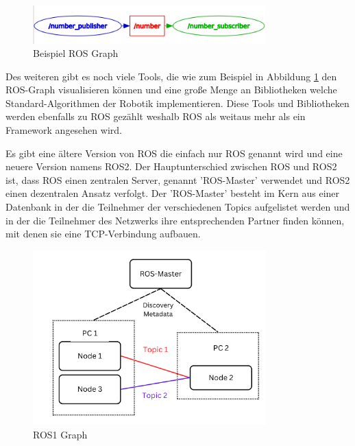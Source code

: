 \begin{flushleft}
\begin{description}
        \begin{figure}[h!]
            \centering
            \includegraphics[width=0.8\textwidth]{imgs/Grundbegriffe/graph_2_nodes_with_topic.png}
            \caption{Beispiel ROS Graph}
            \label{fig:ros_graph}%
        \end{figure}

        Des weiteren gibt es noch viele Tools, die wie zum Beispiel in Abbildung \ref{fig:ros_graph} den ROS-Graph visualisieren können und eine große Menge an Bibliotheken welche Standard-Algorithmen der Robotik implementieren.
        Diese Tools und Bibliotheken werden ebenfalls zu ROS gezählt weshalb ROS als weitaus mehr als ein Framework angesehen wird.

        Es gibt eine ältere Version von ROS die einfach nur ROS genannt wird und eine neuere Version namens ROS2.
        Der Hauptunterschied zwischen ROS und ROS2 ist, dass ROS einen zentralen Server, genannt 'ROS-Master' verwendet und ROS2 einen dezentralen Ansatz verfolgt.
        Der 'ROS-Master' besteht im Kern aus einer Datenbank in der die Teilnehmer der verschiedenen Topics aufgelistet werden und in der die Teilnehmer des Netzwerks ihre entsprechenden Partner finden können, mit denen sie eine TCP-Verbindung aufbauen.
        
        \begin{figure}[h!]
            \centering
            \includegraphics[width=0.8\textwidth]{imgs/ROS1_concept_graph.png}
            \caption{ROS1 Graph}
            \label{fig:ros1_concept_graph}%
        \end{figure}


\end{description}
\end{flushleft}
